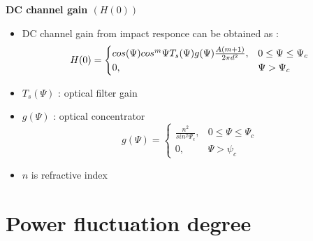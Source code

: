 \documentclass[9pt, dvipsnames]{beamer} %
\begin{document}
   \begin{frame}{\textbf {DC channel gain $(H(0))$}}
          
             \begin{itemize}
                \item DC channel gain from impact responce can be obtained as :
                \begin{equation}
                    H(0)=\begin{cases}
                        cos(\Psi)cos^m\Psi T_s(\Psi)g(\Psi) {\frac{A(m+1)}{2\pi d^2}}, & \text{$ 0\leq \Psi \leq \Psi_c $} \\
                        0, & \text{$\Psi>\Psi_c$}
                    
                          \end{cases}
                \end{equation}
                \item $T_s(\Psi)$ : optical filter gain
                \item $g(\Psi)$ : optical concentrator
              \begin{equation}
                  g(\Psi)=\begin{cases}
                           \frac{n^2}{sin^2\Psi_c},& \text{$0\leq\Psi\leq\Psi_c$}\\
                           0,& \text{$\Psi>\psi_c$}
                          \end{cases}
              \end{equation}
                \item $n$ is refractive index
             \end{itemize}
          
   \end{frame}
\section{Power fluctuation degree}
 
\end{document}
